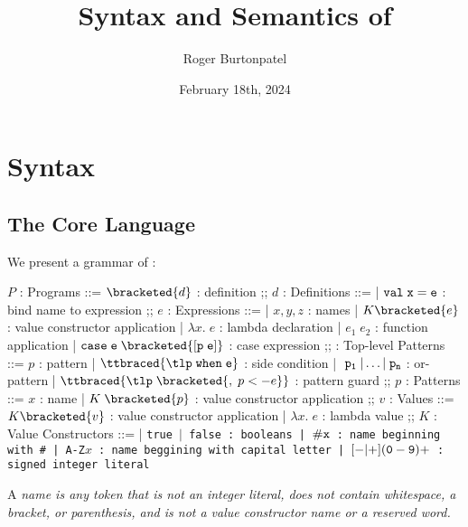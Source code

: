 \documentclass[]{article}
\title{Syntax and Semantics of \PPlus}
\author{Roger Burtonpatel}
\date{February 18th, 2024}
\begin{document}
\maketitle

\section{Syntax}

\subsection{The Core Language}

We present a grammar of \PPlus: 

\bigskip

\begin{center}
    \begin{bnf}
    $P$ : \textsf{Programs} ::=
    $\bracketed{d}$ : definition
    ;;
    $d$ : \textsf{Definitions} ::=
    | $\tt{val} \; x \; \tt{=} \; e$ : bind name to expression
    ;;
    $e$ : Expressions ::= 
    | $x, y, z$ : names
    | $K\bracketed{e}$ : value constructor application 
    | $\lambda x. \; e$ : lambda declaration  
    | $e_{1} \; e_{2}$ : function application 
    | $\tt{case} \; e \; \bracketed{\tt{[} p \; e \tt{]}}$ : case expression 
    ;;
    \tlp : \textsf{Top-level Patterns} ::= $p$ : pattern 
    | $\ttbraced{\tlp \; \tt{when} \; e }$ : side condition
    | $\tt \; p_{1} \; \vert \dots \vert \; p_{n}$ : or-pattern 
    | $\ttbraced{\tlp \; \bracketed{, \; p <- e}}$ : pattern guard
    ;;
    $p$ : \textsf{Patterns} ::= $x$ : name 
    | $K \; \bracketed{p}$ : value constructor application 
    ;;
    $v$ : Values ::= $K\bracketed{v}$ : value constructor application 
    | $\lambda x. \; e$ : lambda value 
    ;;
    $K$ : \textsf{Value Constructors} ::=
    | \tt{true} $\vert$ \tt{false} : booleans
    | $\tt{\#}x$ : name beginning with \tt{\#}
    | \tt{A-Z}$x$ : name beggining with capital letter
    | $[\tt{-}\vert\tt{+}](\tt{0}-\tt{9})+$ : signed integer literal 
    \end{bnf}
\end{center}


A \it{name} is any token that is not an integer literal, 
does not contain whitespace, a bracket, or parenthesis, 
and is not a value constructor name or a reserved word.
\end{document}
